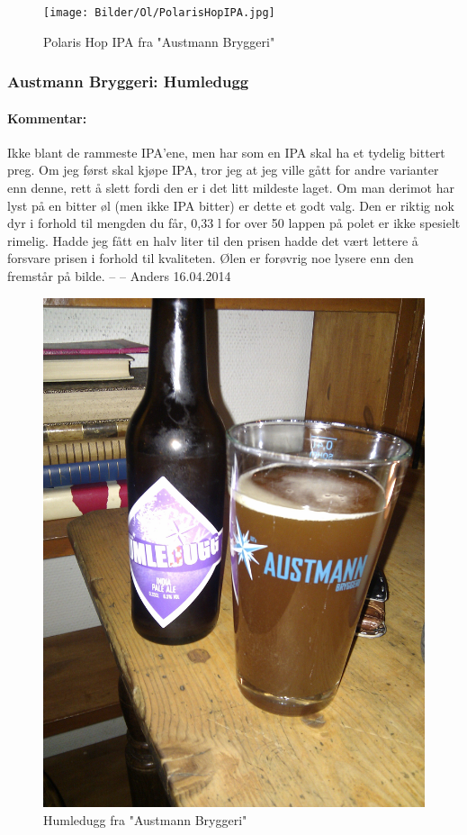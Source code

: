 \documentclass[12pt,a4paper,oneside,norsk]{article}
\begin{document}
\begin{figure} [H]
\centering
\texttt{[image: Bilder/Ol/PolarisHopIPA.jpg]}
\caption{Polaris Hop IPA fra "Austmann Bryggeri"}
\end{figure}

\newpage



\subsubsection{Austmann Bryggeri: Humledugg}
\paragraph{Kommentar:} Ikke blant de rammeste IPA'ene, men har som en IPA skal ha et tydelig bittert preg. Om jeg først skal kjøpe IPA, tror jeg at jeg ville gått for andre varianter enn denne, rett å slett fordi den er i det litt mildeste laget. Om man derimot har lyst på en bitter øl (men ikke IPA bitter) er dette et godt valg. Den er riktig nok dyr i forhold til mengden du får, 0,33 l for over 50 lappen på polet er ikke spesielt rimelig. Hadde jeg fått en halv liter til den prisen hadde det vært lettere å forsvare prisen i forhold til kvaliteten. Ølen er forøvrig noe lysere enn den fremstår på bilde.
\newline
-- -- Anders 16.04.2014

\begin{figure} [H]
\centering
\includegraphics[scale=0.1, angle=0]{Bilder/Ol/humledugg.jpg}
\caption{Humledugg fra "Austmann Bryggeri"}
\end{figure}
\end{document}
